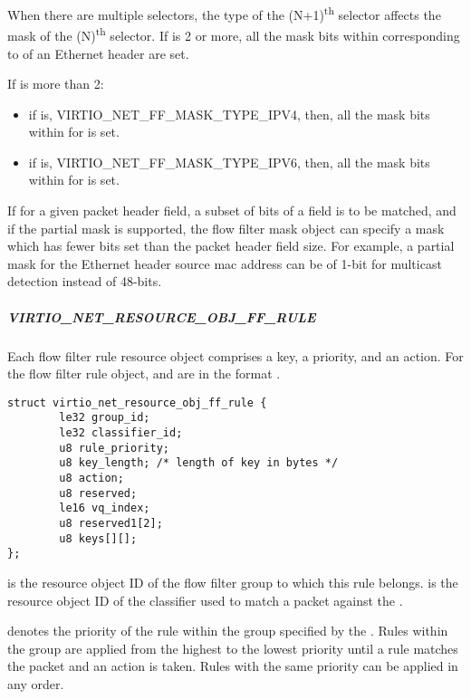 When there are multiple selectors, the type of the (N+1)\textsuperscript{th} selector
affects the mask of the (N)\textsuperscript{th} selector. If
 is 2 or more, all the mask bits within 
corresponding to  of an Ethernet header are set.

If  is more than 2:
\begin{itemize}
\item if  is, VIRTIO_NET_FF_MASK_TYPE_IPV4, then, all the mask bits within
 for  is set.
\item if  is, VIRTIO_NET_FF_MASK_TYPE_IPV6, then, all the mask bits within
 for  is set.
\end{itemize}

If for a given packet header field, a subset of bits of a field is to be matched,
and if the partial mask is supported, the flow filter
mask object can specify a mask which has fewer bits set than the packet header
field size. For example, a partial mask for the Ethernet header source mac
address can be of 1-bit for multicast detection instead of 48-bits.

\subparagraph{VIRTIO_NET_RESOURCE_OBJ_FF_RULE}\label{par:Device Types / Network Device / Device Operation / Flow filter / Resource objects / VIRTIO-NET-RESOURCE-OBJ-FF-RULE}

Each flow filter rule resource object comprises a key, a priority, and an action.
For the flow filter rule object,
 and
 are in the format
.

\begin{lstlisting}
struct virtio_net_resource_obj_ff_rule {
        le32 group_id;
        le32 classifier_id;
        u8 rule_priority;
        u8 key_length; /* length of key in bytes */
        u8 action;
        u8 reserved;
        le16 vq_index;
        u8 reserved1[2];
        u8 keys[][];
};
\end{lstlisting}

 is the resource object ID of the flow filter group to which
this rule belongs.  is the resource object ID of the
classifier used to match a packet against the .

 denotes the priority of the rule within the group
specified by the .
Rules within the group are applied from the highest to the lowest priority
until a rule matches the packet and an
action is taken. Rules with the same priority can be applied in any order.

